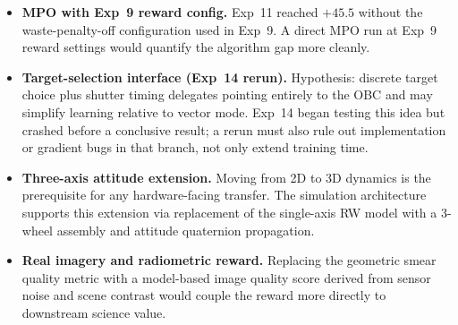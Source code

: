 \begin{itemize}
  \item \textbf{MPO with Exp~9 reward config.}
    Exp~11 reached $+45.5$ without the waste-penalty-off configuration used in Exp~9.
    A direct MPO run at Exp~9 reward settings would quantify the algorithm gap more cleanly.

  \item \textbf{Target-selection interface (Exp~14 rerun).}
    Hypothesis: discrete target choice plus shutter timing delegates pointing entirely to the OBC and may simplify learning relative to vector mode.
    Exp~14 began testing this idea but crashed before a conclusive result; a rerun must also rule out implementation or gradient bugs in that branch, not only extend training time.

  \item \textbf{Three-axis attitude extension.}
    Moving from 2D to 3D dynamics is the prerequisite for any hardware-facing transfer.
    The simulation architecture supports this extension via replacement of the single-axis
    RW model with a 3-wheel assembly and attitude quaternion propagation.

  \item \textbf{Real imagery and radiometric reward.}
    Replacing the geometric smear quality metric with a model-based image quality score
    derived from sensor noise and scene contrast would couple the reward more directly
    to downstream science value.
\end{itemize}
